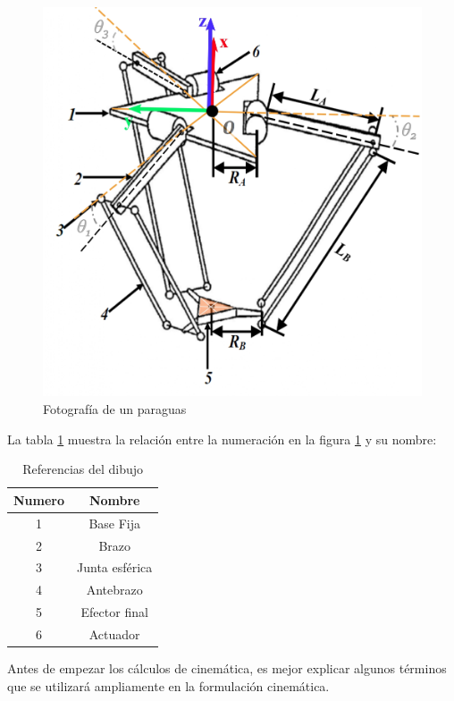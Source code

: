             \begin{figure}[htb]
                 \centering
                 \includegraphics[width=0.55\linewidth]{Main/Chapter4/Images4/DIBUJO24.jpg}
                  \caption{Fotografía de un paraguas}
                  \label{f:Cap4_Metodo_B_Modelacion_Cinematica_Posicion_1}
            \end{figure}        
        
        
        La tabla \ref{tab:cap4_tabla_11} muestra la relación entre la numeración en la figura \ref{f:Cap4_Metodo_B_Modelacion_Cinematica_Posicion_1} y su nombre:
        \begin{table}[h]
            \centering
            \begin{tabular}{c c}
            \hline
                \textbf{Numero}& \textbf{Nombre} \\ 
            \hline             \hline
             1 & Base Fija \\
            \hline
             2 & Brazo \\
            \hline
             3 & Junta esférica \\
            \hline
             4 & Antebrazo\\
            \hline
             5 & Efector final \\
             \hline
             6 & Actuador \\
             \hline
            \end{tabular}
           \caption{Referencias del dibujo}
           \label{tab:cap4_tabla_11}
        \end{table}
        
        
        \newpage

        Antes de empezar los cálculos de cinemática, es mejor explicar algunos términos que se utilizará ampliamente en la formulación cinemática.
        


